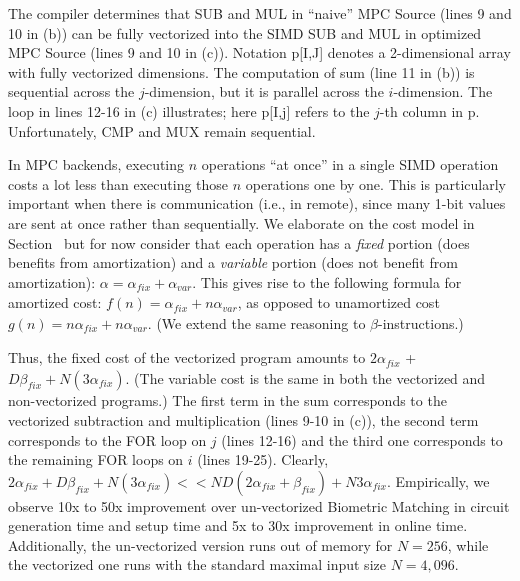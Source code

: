 The compiler determines that SUB and MUL in ``naive'' MPC Source (lines 9 and 10 in (b))
can be fully vectorized into the SIMD SUB and MUL in optimized MPC Source (lines 9 and 10 in (c)).
Notation {\sf p[I,J]} denotes a 2-dimensional array with fully vectorized dimensions.
The computation of sum (line 11 in (b))
is sequential across the $j$-dimension, but it is parallel across the $i$-dimension.
The loop in lines 12-16 in (c) illustrates; here {\sf p[I,j]} refers to the $j$-th column in {\sf p}.
Unfortunately, CMP and MUX remain sequential.

In MPC backends, executing $n$ operations ``at once'' in a single SIMD operation costs a lot less than executing those $n$ operations one by one.
This is particularly important when there is communication (i.e., in remote), since many 1-bit values are sent at once rather than sequentially.
We elaborate on the cost model in Section~ but for now consider that
each operation has a \emph{fixed} portion (does benefits from amortization) and
a \emph{variable} portion (does not benefit from amortization): $\alpha = \alpha_\mathit{fix} + \alpha_\mathit{var}$.
This gives rise to the following formula for amortized cost: $f(n) = \alpha_\mathit{fix} + n\alpha_\mathit{var}$,
as opposed to unamortized cost $g(n) = n\alpha_\mathit{fix} + n\alpha_\mathit{var}$. (We extend the same reasoning to
$\beta$-instructions.)

Thus, the fixed cost of the vectorized program amounts to
$2\alpha_\mathit{fix}$ + $D \beta_\mathit{fix} + N(3\alpha_\mathit{fix})$. (The variable cost is the same in both the vectorized and non-vectorized programs.)
The first term in the sum corresponds to the vectorized
subtraction and multiplication (lines 9-10 in (c)), the second term corresponds to the FOR loop on $j$ (lines 12-16) and the third
one corresponds to the remaining FOR loops on $i$ (lines 19-25). 
Clearly, $2\alpha_\mathit{fix} + D\beta_\mathit{fix} + N(3\alpha_\mathit{fix}) << ND(2\alpha_\mathit{fix}+\beta_\mathit{fix}) + N3\alpha_\mathit{fix}$.
Empirically, we observe 10x to 50x improvement over un-vectorized Biometric Matching in circuit generation time and setup time and 5x to 30x improvement in online time.
Additionally, the un-vectorized version runs out of memory for $N=256$, while the vectorized one runs with the standard maximal input size $N=4,096$.

